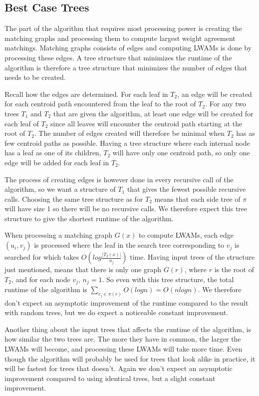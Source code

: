 \subsection{Best Case Trees}
The part of the algorithm that requires most processing power is creating the matching graphs and processing them to compute largest weight agreement matchings. Matching graphs consists of edges and computing LWAMs is done by processing these edges. A tree structure that minimizes the runtime of the algorithm is therefore a tree structure that minimizes the number of edges that needs to be created.

Recall how the edges are determined. For each leaf in $T_2$, an edge will be created for each centroid path encountered from the leaf to the root of $T_2$. For any two trees $T_1$ and $T_2$ that are given the algorithm, at least one edge will be created for each leaf of $T_2$ since all leaves will encounter the centroid path starting at the root of $T_2$. The number of edges created will therefore be minimal when $T_2$ has as few centroid paths as possible. Having a tree structure where each internal node has a leaf as one of its children, $T_2$ will have only one centroid path, so only one edge will be added for each leaf in $T_2$.

The process of creating edges is however done in every recursive call of the algorithm, so we want a structure of $T_1$ that gives the fewest possible recursive calls. Choosing the same tree structure as for $T_2$ means that each side tree of $\pi$ will have size 1 so there will be no recursive calls. We therefore expect this tree structure to give the shortest runtime of the algorithm.

When processing a matching graph $G(x)$ to compute LWAMs, each edge $(u_i, v_j)$ is processed where the leaf in the search tree corresponding to $v_j$ is searched for which takes $O(log\frac{|T_2(x)|}{n_j})$ time. Having input trees of the structure just mentioned, means that there is only one graph $G(r)$, where $r$ is the root of $T_2$, and for each node $v_j$, $n_j = 1$. So even with this tree structure, the total runtime of the algorithm is $\sum_{v_j \in \pi(r)} O(log n) = O(nlogn)$. We therefore don't expect an asymptotic improvement of the runtime compared to the result with random trees, but we do expect a noticeable constant improvement.

Another thing about the input trees that affects the runtime of the algorithm, is how similar the two trees are. The more they have in common, the larger the LWAMs will become, and processing these LWAMs will take more time. Even though the algorithm will probably be used for trees that look alike in practice, it will be fastest for trees that doesn't. Again we don't expect an asymptotic improvement compared to using identical trees, but a slight constant improvement.

